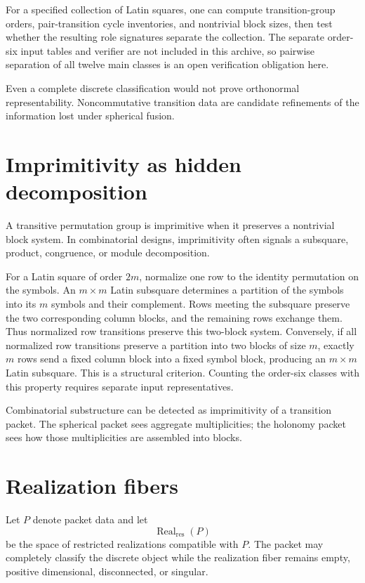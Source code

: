 \begin{skeletonbox}
For a specified collection of Latin squares, one can compute transition-group orders, pair-transition cycle inventories, and nontrivial block sizes, then test whether the resulting role signatures separate the collection.  The separate order-six input tables and verifier are not included in this archive, so pairwise separation of all twelve main classes is an open verification obligation here.
\end{skeletonbox}
Even a complete discrete classification would not prove orthonormal representability.  Noncommutative transition data are candidate refinements of the information lost under spherical fusion.

\section{Imprimitivity as hidden decomposition}
A transitive permutation group is imprimitive when it preserves a nontrivial block system.  In combinatorial designs, imprimitivity often signals a subsquare, product, congruence, or module decomposition.

For a Latin square of order $2m$, normalize one row to the identity permutation on the symbols.  An $m\times m$ Latin subsquare determines a partition of the symbols into its $m$ symbols and their complement.  Rows meeting the subsquare preserve the two corresponding column blocks, and the remaining rows exchange them.  Thus normalized row transitions preserve this two-block system.  Conversely, if all normalized row transitions preserve a partition into two blocks of size $m$, exactly $m$ rows send a fixed column block into a fixed symbol block, producing an $m\times m$ Latin subsquare.  This is a structural criterion.  Counting the order-six classes with this property requires separate input representatives.

\begin{principle}
Combinatorial substructure can be detected as imprimitivity of a transition packet.  The spherical packet sees aggregate multiplicities; the holonomy packet sees how those multiplicities are assembled into blocks.
\end{principle}

\section{Realization fibers}
Let $P$ denote packet data and let
\[
\operatorname{Real}_{\mathrm{res}}(P)
\]
be the space of restricted realizations compatible with $P$.  The packet may completely classify the discrete object while the realization fiber remains empty, positive dimensional, disconnected, or singular.

